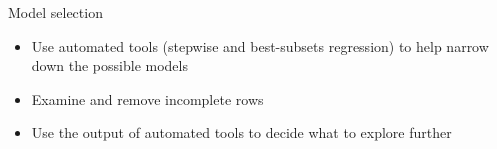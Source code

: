 \documentclass{beamer}\usepackage[]{graphicx}\usepackage[]{color}
\begin{document}
\begin{darkframes}
    \begin{frame}{Model selection}
      \begin{itemize}
        \item Use automated tools (stepwise and best-subsets regression) to help narrow down the possible models
        \item Examine and remove incomplete rows
        \item Use the output of automated tools to decide what to explore further
      \end{itemize}
    \end{frame}
  \end{darkframes}
\end{document}

